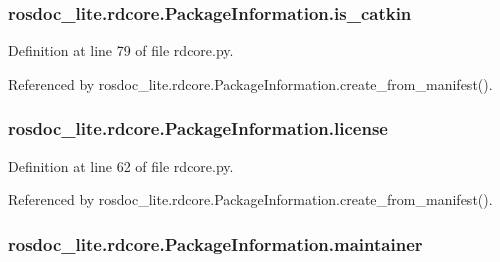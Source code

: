 \subsubsection[{\texorpdfstring{is\+\_\+catkin}{is_catkin}}]{\setlength{\rightskip}{0pt plus 5cm}rosdoc\+\_\+lite.\+rdcore.\+Package\+Information.\+is\+\_\+catkin}\hypertarget{classrosdoc__lite_1_1rdcore_1_1PackageInformation_a62a03a706ae759bc4e44fce551846df8}{}\label{classrosdoc__lite_1_1rdcore_1_1PackageInformation_a62a03a706ae759bc4e44fce551846df8}


Definition at line 79 of file rdcore.\+py.



Referenced by rosdoc\+\_\+lite.\+rdcore.\+Package\+Information.\+create\+\_\+from\+\_\+manifest().

\subsubsection[{\texorpdfstring{license}{license}}]{\setlength{\rightskip}{0pt plus 5cm}rosdoc\+\_\+lite.\+rdcore.\+Package\+Information.\+license}\hypertarget{classrosdoc__lite_1_1rdcore_1_1PackageInformation_a64ff5843063bf71f16f4cdab4d1bbd18}{}\label{classrosdoc__lite_1_1rdcore_1_1PackageInformation_a64ff5843063bf71f16f4cdab4d1bbd18}


Definition at line 62 of file rdcore.\+py.



Referenced by rosdoc\+\_\+lite.\+rdcore.\+Package\+Information.\+create\+\_\+from\+\_\+manifest().

\subsubsection[{\texorpdfstring{maintainer}{maintainer}}]{\setlength{\rightskip}{0pt plus 5cm}rosdoc\+\_\+lite.\+rdcore.\+Package\+Information.\+maintainer}\hypertarget{classrosdoc__lite_1_1rdcore_1_1PackageInformation_a1972daa7cde3c680c98bb054eda418a5}{}\label{classrosdoc__lite_1_1rdcore_1_1PackageInformation_a1972daa7cde3c680c98bb054eda418a5}


